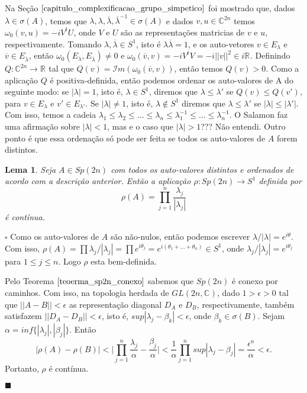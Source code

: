 \documentclass[12pt]{book}
\newtheorem{lema}[teorema]{Lema}
\newenvironment{prova}[1]{$\square$ #1}{\hfill$\blacksquare$}
\newcommand{\circulo}{S^{1}}
\newcommand{\complexo}[1]{\mathbb{C}^{#1}}
\newcommand{\formaSimpleticaPadrao}[2]{\omega_{0}(#1, #2)}
\newcommand{\generalgroup}[2]{GL(#1, #2)}
\newcommand{\generalgroupcomplexo}[1]{\generalgroup{#1}{\complexo{}}}
\newcommand{\gruposimpletico}[1]{Sp(#1)}
\newcommand{\norma}[1]{||#1||}
\newcommand{\parteImaginaria}[1]{\mathcal{I}m(#1)}
\newcommand{\real}[1]{\mathbb{R}^{#1}}
\newcommand{\reta}{\real{}}
\newcommand{\vermelho}[1]{{\color{red}#1}}
\begin{document}
		Na Seção $\ref{capitulo_complexificacao_grupo_simpetico}$ foi mostrado que, dados $\lambda \in \sigma(A)$, temos que $\lambda, \lambda , \overline{\lambda}, \overline{\lambda}^{-1}  \in \sigma(A)$ e dados $v, u \in \complexo{2n}$ temos $\formaSimpleticaPadrao{v}{u}= -iV^{t}U$, onde $V$ e $U$ são as representações matricias de $v$ e $u$, respectivamente. Tomando $\lambda, \overline{\lambda} \in \circulo$, isto é $\lambda\overline{\lambda} = 1$, e os auto-vetores $v \in E_{\lambda}$ e $\overline{v} \in E_{\overline{\lambda}}$, então $\formaSimpleticaPadrao{E_{\lambda}}{E_{\overline{\lambda}}} \neq 0$ e $\formaSimpleticaPadrao{\overline{v}}{v} =-iV^{t}V=- i\norma{v}^{2}\in i\reta$. Definindo $Q: \complexo{2n} \to \reta$ tal que $Q(v) = \parteImaginaria{\formaSimpleticaPadrao{\overline{v}}{v}}$, então temos $Q(v)>0$. Como a aplicação $Q$ é positiva-definida, então podemos ordenar os auto-valores de A do seguinte modo: se $|\lambda| = 1$, isto é, $\lambda \in \circulo$, diremos que $\lambda \leq \lambda'$ se $ Q(v) \leq Q(v')$, para $v\in E_{\lambda}$ e $v'\in E_{\lambda'}$. Se $|\lambda| \neq 1$, isto é, $\lambda \notin \circulo$ diremos que $\lambda \leq \lambda'$ se $|\lambda| \leq |\lambda'|$. Com isso, temos a cadeia $\lambda_{1} \leq \lambda_{2} \leq \dots\leq \lambda_{n}\leq \lambda_{1}^{-1}\leq \dots\leq \lambda_{n}^{-1}$. \vermelho{O Salamon faz uma afirmação sobre $|\lambda|<1$, mas e o caso que $|\lambda|>1$??? Não entendi. Outro ponto é que essa ordenação só pode ser feita se todos os auto-valores de $A$ forem distintos.}
		
		\begin{lema}
			Seja $A\in \gruposimpletico{2n}$ \vermelho{com todos os auto-valores distintos e ordenados de acordo com a descrição anterior.} Então a aplicação $\rho:\gruposimpletico{2n} \to \circulo$ definida por 
			$$
				\rho(A) = \prod_{j=1}^{n}\frac{\lambda_{j}}{|\lambda_{j}|}
			$$
			é contínua.
		\end{lema}
	\begin{prova}
		Como os auto-valores de $A$ são não-nulos, então podemos escrever $\lambda/|\lambda| = e^{i\theta}$. Com isso, $\rho(A)=\prod \lambda_{j}/|\lambda_{j}| = \prod e^{i\theta_{j}} = e^{i(\theta_{1}+\dots +\theta_{n})} \in \circulo$, onde $\lambda_{j}/|\lambda_{j}| = e^{i\theta_{j}}$ para $1\leq j \leq n$. Logo $\rho$ esta bem-definida.
		
		Pelo Teorema $\ref{teoerma_sp2n_conexo}$ sabemos que $\gruposimpletico{2n}$ é conexo por caminhos. Com isso, na topologia herdada de $\generalgroupcomplexo{2n}$, dado $1>\epsilon >0$ tal que $\norma{A-B}< \epsilon$ as representação diagonal $D_{A}$ e $D_{B}$, respectivamente, também satisfazem $\norma{D_{A}-D_{B}}< \epsilon$, isto é, $sup|\lambda_{j}-\beta_{k}| < \epsilon$, onde $\beta_{k} \in \sigma(B)$. Sejam $\alpha = inf \{|\lambda_{j}|,|\beta_{j}|\}$. Então
		$$
		|\rho(A) -\rho(B)| < \Big|\prod_{j=1}^{n} \frac{\lambda_{j}}{\alpha} - \frac{\beta_{j}}{\alpha} \Big| <\frac{1}{\alpha}\prod_{j=1}^{n} sup|\lambda_{j} - \beta_{j}|=\frac{\epsilon^{n}}{\alpha}<\epsilon.
		$$
		Portanto, $\rho$ é contínua.
		
	\end{prova}		
		
\end{document}
